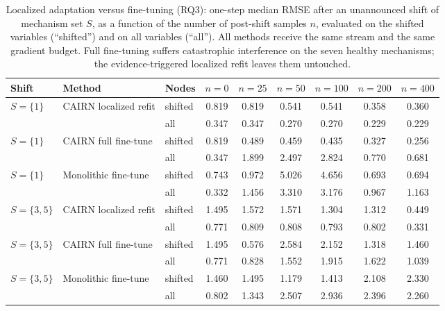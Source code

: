 \begin{table}[t]
\caption{Localized adaptation versus fine-tuning (RQ3): one-step median
RMSE after an unannounced shift of mechanism set $S$, as a function of the
number of post-shift samples $n$, evaluated on the shifted variables
(``shifted'') and on all variables (``all''). All methods receive the same
stream and the same gradient budget. Full fine-tuning suffers catastrophic
interference on the seven healthy mechanisms; the evidence-triggered
localized refit leaves them untouched.}\label{tab:rq3}
\footnotesize\setlength{\tabcolsep}{2.5pt}%
\begin{tabular}{lllcccccc}
\toprule
Shift & Method & Nodes & $n{=}0$ & $n{=}25$ & $n{=}50$ & $n{=}100$ & $n{=}200$ & $n{=}400$\\
\midrule
$S{=}\{1\}$ & CAIRN localized refit & shifted & 0.819 & 0.819 & 0.541 & 0.541 & 0.358 & 0.360 \\
 &  & all & 0.347 & 0.347 & 0.270 & 0.270 & 0.229 & 0.229 \\
$S{=}\{1\}$ & CAIRN full fine-tune & shifted & 0.819 & 0.489 & 0.459 & 0.435 & 0.327 & 0.256 \\
 &  & all & 0.347 & 1.899 & 2.497 & 2.824 & 0.770 & 0.681 \\
$S{=}\{1\}$ & Monolithic fine-tune & shifted & 0.743 & 0.972 & 5.026 & 4.656 & 0.693 & 0.694 \\
 &  & all & 0.332 & 1.456 & 3.310 & 3.176 & 0.967 & 1.163 \\
\midrule
$S{=}\{3,5\}$ & CAIRN localized refit & shifted & 1.495 & 1.572 & 1.571 & 1.304 & 1.312 & 0.449 \\
 &  & all & 0.771 & 0.809 & 0.808 & 0.793 & 0.802 & 0.331 \\
$S{=}\{3,5\}$ & CAIRN full fine-tune & shifted & 1.495 & 0.576 & 2.584 & 2.152 & 1.318 & 1.460 \\
 &  & all & 0.771 & 0.828 & 1.552 & 1.915 & 1.622 & 1.039 \\
$S{=}\{3,5\}$ & Monolithic fine-tune & shifted & 1.460 & 1.495 & 1.179 & 1.413 & 2.108 & 2.330 \\
 &  & all & 0.802 & 1.343 & 2.507 & 2.936 & 2.396 & 2.260 \\
\bottomrule
\end{tabular}
\end{table}

